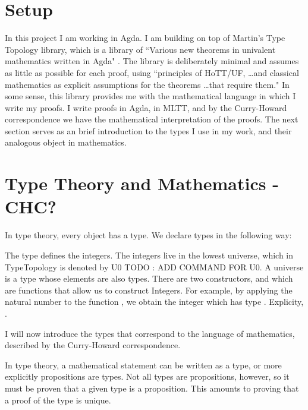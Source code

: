 \documentclass[ProjectReport]{subfiles}
\begin{document}
\section{Setup}

In this project I am working in Agda. I am building on top of Martin's Type Topology library, which is a library of ``Various new theorems in univalent mathematics written in Agda" \cite{TypeTopology}. The library is deliberately minimal and assumes as little as possible for each proof, using ``principles of HoTT/UF, \ldots and classical mathematics as explicit assumptions for the theorems \ldots that require them." In some sense, this library provides me with the mathematical language in which I write my proofs. I write proofs in Agda, in MLTT, and by the Curry-Howard correspondence we have the mathematical interpretation of the proofs.  The next section serves as an brief introduction to the types I use in my work, and their analogous object in mathematics.

\section{Type Theory and Mathematics - CHC?}

In type theory, every object has a type. We declare types in the following way:

\TypeExample

The type  defines the integers. The integers live in the lowest universe, which in TypeTopology is denoted by U0 {TODO : ADD COMMAND FOR U0}. A universe is a type whose elements are also types. There are two constructors,  and  which are functions that allow us to construct Integers. For example, by applying the natural number  to the function , we obtain the integer \AgdaSpace{} which has type . Explicity,
\AgdaSpace{}%
\AgdaSymbol{:}\AgdaSpace{}%
.

I will now introduce the types that correspond to the language of mathematics, described by the Curry-Howard correspondence. 

In type theory, a mathematical statement can be written as a type, or more explicitly propositions are types. Not all types are propositions, however, so it must be proven that a given type is a proposition. This amounts to proving that a proof of the type is unique.
\end{document}
